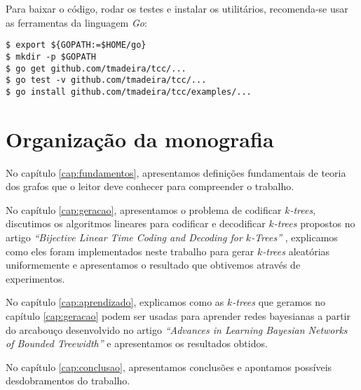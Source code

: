 Para baixar o código, rodar os testes e instalar os utilitários, recomenda-se usar as ferramentas da linguagem \emph{Go}:

\begin{lstlisting}
$ export ${GOPATH:=$HOME/go}
$ mkdir -p $GOPATH
$ go get github.com/tmadeira/tcc/...
$ go test -v github.com/tmadeira/tcc/...
$ go install github.com/tmadeira/tcc/examples/...
\end{lstlisting}

\section{Organização da monografia}

No capítulo \ref{cap:fundamentos}, apresentamos definições fundamentais de teoria dos grafos que o leitor deve conhecer para compreender o trabalho.

No capítulo \ref{cap:geracao}, apresentamos o problema de codificar \emph{$k$-trees}, discutimos os algoritmos lineares para codificar e decodificar \emph{$k$-trees} propostos no artigo \emph{``Bijective Linear Time Coding and Decoding for $k$-Trees''} \cite{caminiti}, explicamos como eles foram implementados neste trabalho para gerar \emph{$k$-trees} aleatórias uniformemente e apresentamos o resultado que obtivemos através de experimentos.

No capítulo \ref{cap:aprendizado}, explicamos como as \emph{$k$-trees} que geramos no capítulo \ref{cap:geracao} podem ser usadas para aprender redes bayesianas a partir do arcabouço desenvolvido no artigo \emph{``Advances in Learning Bayesian Networks of Bounded Treewidth''} \cite{maua} e apresentamos os resultados obtidos.

No capítulo \ref{cap:conclusao}, apresentamos conclusões e apontamos possíveis desdobramentos do trabalho.
